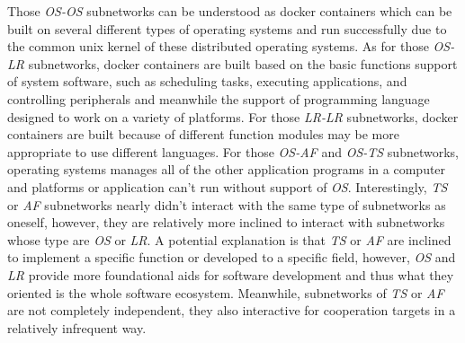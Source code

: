 \documentclass[sigconf]{acmart}
\begin{document}


Those \emph{OS-OS} subnetworks can be understood as docker containers which can be built on several different types of operating systems and run successfully due to the common unix kernel of these distributed operating systems.  As for those \emph{OS-LR} subnetworks, docker containers are built based on the basic functions support of system software, such as scheduling tasks, executing applications, and controlling peripherals and meanwhile the support of programming language designed to work on a variety of platforms.  For those \emph{LR-LR} subnetworks, docker containers are built because of different function modules may be more appropriate to use different languages. %
For those \emph{OS-AF} and \emph{OS-TS} subnetworks, operating systems manages all of the other application programs in a computer and platforms or application can't run without support of \emph{OS}. %
Interestingly, \emph{TS} or \emph{AF} subnetworks nearly didn't interact with the same type of subnetworks as oneself, however, they are relatively more inclined to interact with subnetworks whose type are \emph{OS} or \emph{LR}.   
A potential explanation is that \emph{TS} or \emph{AF} are inclined to implement a specific function or developed to a specific field, however, \emph{OS} and \emph{LR} provide more foundational aids for software development and thus what they oriented is the whole software ecosystem. Meanwhile, subnetworks of \emph{TS} or \emph{AF} are not completely independent, they also interactive for cooperation targets in a relatively infrequent way. %
\end{document}
